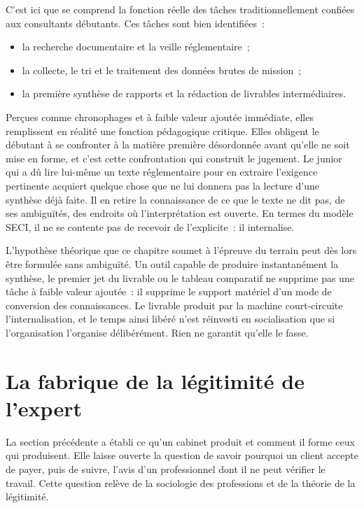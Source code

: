 C'est ici que se comprend la fonction réelle des tâches traditionnellement confiées aux
consultants débutants. Ces tâches sont bien identifiées~:
\begin{itemize}
    \item la recherche documentaire et la veille réglementaire~;
    \item la collecte, le tri et le traitement des données brutes de mission~;
    \item la première synthèse de rapports et la rédaction de livrables intermédiaires.
\end{itemize}

Perçues comme chronophages et à faible valeur ajoutée immédiate, elles remplissent en
réalité une fonction pédagogique critique. Elles obligent le débutant à se confronter à la
matière première désordonnée avant qu'elle ne soit mise en forme, et c'est cette
confrontation qui construit le jugement. Le junior qui a dû lire lui-même un texte
réglementaire pour en extraire l'exigence pertinente acquiert quelque chose que ne lui
donnera pas la lecture d'une synthèse déjà faite. Il en retire la connaissance de ce que le
texte ne dit pas, de ses ambiguïtés, des endroits où l'interprétation est ouverte. En termes du
modèle SECI, il ne se contente pas de recevoir de l'explicite~: il internalise.

L'hypothèse théorique que ce chapitre soumet à l'épreuve du terrain peut dès lors être
formulée sans ambiguïté. Un outil capable de produire instantanément la synthèse, le
premier jet du livrable ou le tableau comparatif ne supprime pas une tâche à faible valeur
ajoutée~: il supprime le support matériel d'un mode de conversion des connaissances. Le
livrable produit par la machine court-circuite l'internalisation, et le temps ainsi libéré
n'est réinvesti en socialisation que si l'organisation l'organise délibérément. Rien ne
garantit qu'elle le fasse.

\section{La fabrique de la légitimité de l'expert}

La section précédente a établi ce qu'un cabinet produit et comment il forme ceux qui
produisent. Elle laisse ouverte la question de savoir pourquoi un client accepte de payer,
puis de suivre, l'avis d'un professionnel dont il ne peut vérifier le travail. Cette
question relève de la sociologie des professions et de la théorie de la légitimité.

